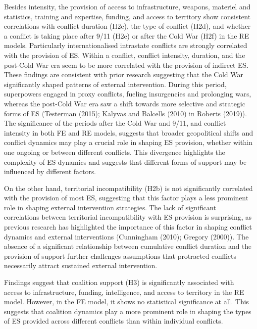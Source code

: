 \documentclass[
]{article}
\begin{document}
Besides intensity, the provision of access to infrastructure, weapons,
materiel and statistics, training and expertise, funding, and access to
territory show consistent correlations with conflict duration (H2c), the
type of conflict (H2d), and whether a conflict is taking place after
9/11 (H2e) or after the Cold War (H2f) in the RE models. Particularly
internationalised intrastate conflicts are strongly correlated with the
provision of ES. Within a conflict, conflict intensity, duration, and
the post-Cold War era seem to be more correlated with the provision of
indirect ES. These findings are consistent with prior research
suggesting that the Cold War significantly shaped patterns of external
intervention. During this period, superpowers engaged in proxy
conflicts, fueling insurgencies and prolonging wars, whereas the
post-Cold War era saw a shift towards more selective and strategic forms
of ES (Testerman (2015); Kalyvas and Balcells (2010) in Roberts (2019)).
The significance of the periods after the Cold War and 9/11, and
conflict intensity in both FE and RE models, suggests that broader
geopolitical shifts and conflict dynamics may play a crucial role in
shaping ES provision, whether within one ongoing or between different
conflicts. This divergence highlights the complexity of ES dynamics and
suggests that different forms of support may be influenced by different
factors.

On the other hand, territorial incompatibility (H2b) is not
significantly correlated with the provision of most ES, suggesting that
this factor plays a less prominent role in shaping external intervention
strategies. The lack of significant correlations between territorial
incompatibility with ES provision is surprising, as previous research
has highlighted the importance of this factor in shaping conflict
dynamics and external interventions (Cunningham (2010); Gregory (2000)).
The absence of a significant relationship between cumulative conflict
duration and the provision of support further challenges assumptions
that protracted conflicts necessarily attract sustained external
intervention.

Findings suggest that coalition support (H3) is significantly associated
with access to infrastructure, funding, intelligence, and access to
territory in the RE model. However, in the FE model, it shows no
statistical significance at all. This suggests that coalition dynamics
play a more prominent role in shaping the types of ES provided across
different conflicts than within individual conflicts.
\end{document}
